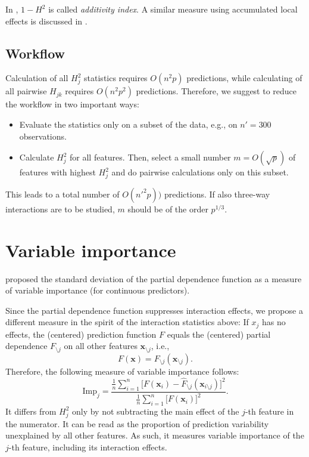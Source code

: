 \documentclass[]{article}
\begin{document}
In \cite{zolkowski2023}, $1 - H^2$ is called {\em additivity index}. A similar measure using accumulated local effects is discussed in \cite{molnar2020}.

\subsection{Workflow}
Calculation of all $H_j^2$ statistics requires $O(n^2p)$ predictions, while calculating of all pairwise $H_{jk}$ requires $O(n^2 p^2)$ predictions. Therefore, we suggest to reduce the workflow in two important ways:
\begin{itemize}
\item Evaluate the statistics only on a subset of the data, e.g., on $n' = 300$ observations.
\item Calculate $H_j^2$ for all features. Then, select a small number $m = O(\sqrt{p})$ of features with highest $H^2_j$ and do pairwise calculations only on this subset.
\end{itemize}
This leads to a total number of $O(n'^2 p))$ predictions. If also three-way interactions are to be studied, $m$ should be of the order $p^{1/3}$.

\section{Variable importance}

\cite{greenwell2018} proposed the standard deviation of the partial dependence function as a measure of variable importance (for continuous predictors). 

Since the partial dependence function suppresses interaction effects, we propose a different measure in the spirit of the interaction statistics above: If $x_j$ has no effects, the (centered) prediction function $F$ equals the (centered) partial dependence $F_{\setminus j}$ on all other features $\mathbf{x}_{\setminus j}$, i.e.,
$$
	F(\mathbf{x}) = F_{\setminus j}(\mathbf{x}_{\setminus j}).
$$
Therefore, the following measure of variable importance follows:
$$
	\textrm{Imp}_j = \frac{\frac{1}{n} \sum_{i = 1}^n\big[F(\mathbf{x}_i) - \hat F_{\setminus j}(\mathbf{x}_{i\setminus j})\big]^2}{\frac{1}{n} \sum_{i = 1}^n\big[F(\mathbf{x}_i)\big]^2}.
$$
It differs from $H^2_j$ only by not subtracting the main effect of the $j$-th feature in the numerator. It can be read as the proportion of prediction variability unexplained by all other features. As such, it measures variable importance of the $j$-th feature, including its interaction effects. 



\end{document}

